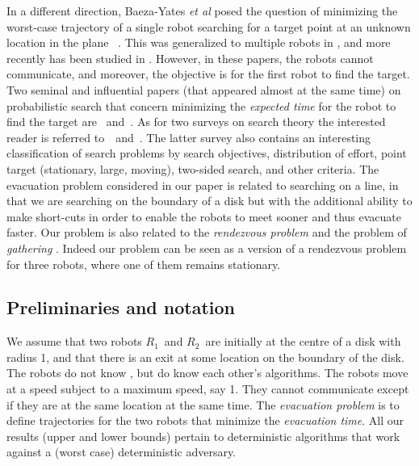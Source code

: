 \documentclass[
final
]{dmtcs-episciences}
\newcommand{\RA}{\ensuremath{R_1}}
\newcommand{\RB}{\ensuremath{R_2 }}
\theoremstyle{definition}
\begin{document}
In a different direction, Baeza-Yates {\em et al} posed the question of minimizing the worst-case trajectory of a single robot searching for a target point at an unknown location in the plane ~\cite{baezayates1993searching}. This was generalized to multiple robots in \cite{LS01}, and more recently has been studied  in \cite{Emekicalp2014,Lenzen2014}. However, in these papers, the robots cannot communicate, and moreover, the objective is for the first robot to find the target. 
Two seminal and influential papers (that appeared almost at the
same time) on probabilistic search that concern minimizing the {\em expected time}  for the robot to find the target are
\cite{beck1964linear}~and~\cite{bellman1963optimal}.
As for two surveys on search theory the interested reader is referred to~\cite{benkoski1991survey}~and~\cite{dobbie1968survey}.
The latter survey also contains 
an interesting classification of
search problems by search objectives, distribution of effort, point target
(stationary, large, moving), two-sided search, and other criteria.
The evacuation problem considered in our paper
is related to searching on a line, in that we are searching
on the boundary of a disk but with the
additional ability to make short-cuts in order
to enable the robots to meet sooner
and thus evacuate faster. 
Our problem is also related to the  {\em rendezvous problem}  and the problem of  {\em gathering} \cite{alpern1999asymmetric,PGNP2005}. Indeed our problem can be seen as a version of a rendezvous problem for three robots, where one of them remains stationary. 




\subsection{Preliminaries and notation}
\label{subsec:prelim}







We assume that two robots \RA\ and \RB\  are initially at the centre of a disk with radius 1, and that there is an exit at some location  on the boundary of the disk. 
The robots do not know , but do know each other's algorithms. 
The robots move at a speed subject to a maximum speed, say 1. 
They cannot communicate except if they are at the same location at the same time. 
The {\em evacuation problem} is to define trajectories for the two robots that minimize the {\em evacuation time}.
All our results (upper and lower bounds) pertain to deterministic algorithms that work against a (worst case) deterministic adversary. 
\end{document}
